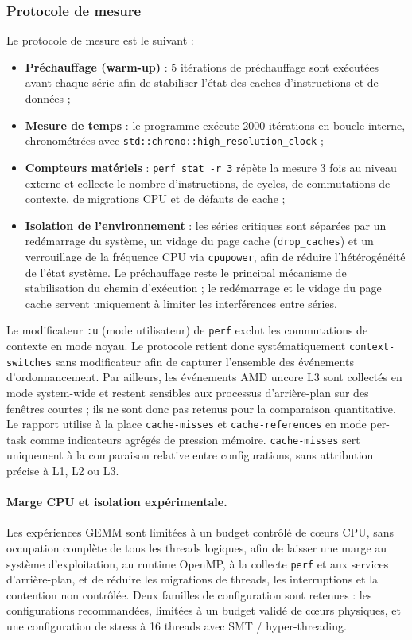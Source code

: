 \documentclass[a4paper,11pt,oneside]{article}
\begin{document}
\subsubsection{Protocole de mesure}\label{subsec:gemm_protocol}

Le protocole de mesure est le suivant :
\begin{itemize}
    \item \textbf{Préchauffage (warm-up)} : 5 itérations de préchauffage sont exécutées avant chaque série afin de stabiliser l'état des caches d'instructions et de données ;
    \item \textbf{Mesure de temps} : le programme exécute 2000 itérations en boucle interne, chronométrées avec \texttt{std::chrono::high\_resolution\_clock} ;
    \item \textbf{Compteurs matériels} : \texttt{perf stat -r 3} répète la mesure 3 fois au niveau externe et collecte le nombre d'instructions, de cycles, de commutations de contexte, de migrations CPU et de défauts de cache ;
    \item \textbf{Isolation de l'environnement} : les séries critiques sont séparées par un redémarrage du système, un vidage du page cache (\texttt{drop\_caches}) et un verrouillage de la fréquence CPU via \texttt{cpupower}, afin de réduire l'hétérogénéité de l'état système.
          Le préchauffage reste le principal mécanisme de stabilisation du chemin d'exécution ; le redémarrage et le vidage du page cache servent uniquement à limiter les interférences entre séries.
\end{itemize}

Le modificateur \texttt{:u} (mode utilisateur) de \texttt{perf} exclut les commutations de contexte en mode noyau.
Le protocole retient donc systématiquement \texttt{context-switches} sans modificateur afin de capturer l'ensemble des événements d'ordonnancement.
Par ailleurs, les événements AMD uncore L3 sont collectés en mode system-wide et restent sensibles aux processus d'arrière-plan sur des fenêtres courtes ; ils ne sont donc pas retenus pour la comparaison quantitative.
Le rapport utilise à la place \texttt{cache-misses} et \texttt{cache-references} en mode per-task comme indicateurs agrégés de pression mémoire.
\texttt{cache-misses} sert uniquement à la comparaison relative entre configurations, sans attribution précise à L1, L2 ou L3.

\paragraph{Marge CPU et isolation expérimentale.}
Les expériences GEMM sont limitées à un budget contrôlé de cœurs CPU, sans occupation complète de tous les threads logiques, afin de laisser une marge au système d'exploitation, au runtime OpenMP, à la collecte \texttt{perf} et aux services d'arrière-plan, et de réduire les migrations de threads, les interruptions et la contention non contrôlée.
Deux familles de configuration sont retenues : les configurations recommandées, limitées à un budget validé de cœurs physiques, et une configuration de stress à 16 threads avec SMT / hyper-threading.
\end{document}
